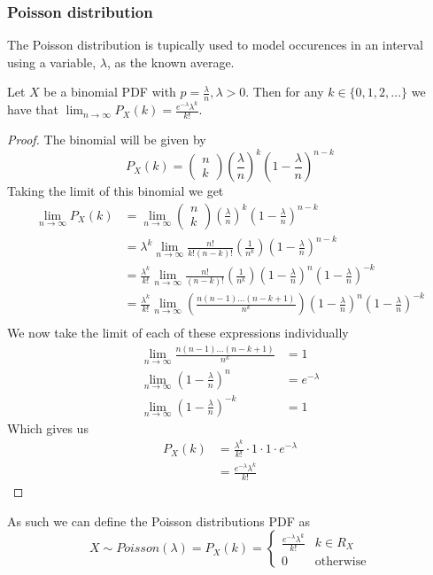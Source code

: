 \subsubsection{Poisson distribution}
The Poisson distribution is tupically used to model occurences in an interval using a variable, $\lambda$, as the known average.
\begin{theorem}
    Let $X$ be a binomial PDF with $p=\frac{\lambda}{n},\lambda>0$. Then for any $k\in\{0,1,2,\ldots\}$ we have that $\lim_{n\rightarrow\infty}P_{X}(k)=\frac{e^{-\lambda}\lambda^{k}}{k!}$.
\end{theorem}
\begin{proof}
  The binomial will be given by
  \[
    P_{X}(k)=\begin{pmatrix}n\\k\end{pmatrix}\left(\frac{\lambda}{n}\right)^{k}\left(1-\frac{\lambda}{n}\right)^{n-k}
  \]
  Taking the limit of this binomial we get
  \begin{align*}
      \lim_{n\rightarrow\infty}P_{X}(k)&=\lim_{n\rightarrow\infty}\begin{pmatrix}n\\k\end{pmatrix}\left(\frac{\lambda}{n}\right)^{k}\left(1-\frac{\lambda}{n}\right)^{n-k} \\
                        &=\lambda^{k}\lim_{n\rightarrow\infty}\frac{n!}{k!(n-k)!}\left(\frac{1}{n^{k}}\right)\left(1-\frac{\lambda}{n}\right)^{n-k} \\
                        &=\frac{\lambda^{k}}{k!}\lim_{n\rightarrow\infty}\frac{n!}{(n-k)!}\left(\frac{1}{n^{k}}\right)\left(1-\frac{\lambda}{n}\right)^{n}\left(1-\frac{\lambda}{n}\right)^{-k} \\
                        &=\frac{\lambda^{k}}{k!}\lim_{n\rightarrow\infty}\left(\frac{n(n-1)\ldots(n-k+1)}{n^{k}}\right)\left(1-\frac{\lambda}{n}\right)^{n}\left(1-\frac{\lambda}{n}\right)^{-k} \\
  \end{align*}
  We now take the limit of each of these expressions individually
  \begin{align*}
      \lim_{n\rightarrow\infty}\frac{n(n-1)\ldots(n-k+1)}{n^{k}}&=1 \\
      \lim_{n\rightarrow\infty}\left(1-\frac{\lambda}{n}\right)^{n}&=e^{-\lambda} \\
      \lim_{n\rightarrow\infty}\left(1-\frac{\lambda}{n}\right)^{-k}&=1 
  \end{align*}
  Which gives us
  \begin{align*}
      P_{X}(k)&=\frac{\lambda^{k}}{k!}\cdot 1\cdot 1\cdot e^{-\lambda} \\
              &=\frac{e^{-\lambda}\lambda^{k}}{k!}
  \end{align*}
\end{proof}
As such we can define the Poisson distributions PDF as
\[
    X\sim Poisson(\lambda)=P_{X}(k)=\begin{cases}\frac{e^{-\lambda}\lambda^{k}}{k!} & k\in R_X \\ 0 & \text{otherwise}\end{cases}
\]
